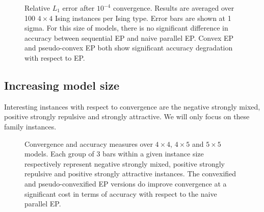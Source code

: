 \documentclass[times, 10pt,twocolumn]{article}
\begin{document}
\begin{figure}
	\caption{Relative $L_1$ error after $10^{-4}$ convergence. Results are averaged over 100 $4 \times 4$ Ising instances per Ising type. Error bars are shown at 1 sigma. For this size of models, there is no significant difference in accuracy between sequential EP and naive parallel EP. Convex EP and pseudo-convex EP both show significant accuracy degradation with respect to EP.}
\end{figure}

\newpage
\subsection{Increasing model size}
Interesting instances with respect to convergence are the negative strongly mixed, positive strongly repulsive and strongly attractive. We will only focus on these family instances.

\newpage
\begin{figure}\centering
	\caption{Convergence and accuracy measures over $4 \times 4$, $4 \times 5$ and $5 \times 5$ models. Each group of 3 bars within a given instance size respectively represent negative strongly mixed, positive strongly repulsive and positive strongly attractive instances. The convexified and pseudo-convexified EP versions do improve convergence at a significant cost in terms of accuracy with respect to the naive parallel EP.}
\end{figure}
\end{document}
